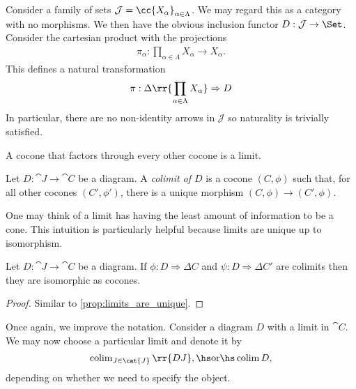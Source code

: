 \documentclass{article}
\begin{document}
\begin{example}
  Consider a family of sets $\mathcal J=\cc{X_\alpha}_{\alpha\in\Lambda}$. We may
  regard this as a category with no morphisms. We then have
  the obvious inclusion functor $D:\mathcal J\to\Set$. Consider the cartesian
  product with the projections
  \begin{align*}
    \pi_\alpha : \prod_{\alpha\in\Lambda} X_\alpha \to X_\alpha.
  \end{align*}
  This defines a natural transformation
  \begin{align*}
    \pi : \Delta\rr{\prod_{\alpha\in\Lambda} X_\alpha}\Rightarrow D
  \end{align*}
  In particular, there are no non-identity arrows in $\mathcal J$ so
  naturality is trivially satisfied.
\end{example}

A cocone that factors through every other cocone is a limit.

\begin{definition}
  Let $D:\cat{J}\to\cat{C}$ be a diagram. A \emph{colimit of $D$} is a cocone
  $(C,\phi)$ such that, for all other cocones $(C',\phi')$, there is a unique morphism
  $(C,\phi)\to(C',\phi)$.
\end{definition}

One may think of a limit has having the least amount of information to be a cone.
This intuition is particularly helpful because limits are unique up to isomorphism.

\begin{proposition}
  Let $D:\cat{J}\to\cat{C}$ be a diagram. If $\phi:D\Rightarrow\Delta C$
  and $\psi:D\Rightarrow\Delta C'$ are colimits then they are isomorphic as cocones.
  \begin{proof}
    Similar to \ref{prop:limits_are_unique}.
  \end{proof}
\end{proposition}

\begin{notation}
  Once again, we improve the notation. Consider a diagram
  $D$ with a limit in $\cat{C}$. We may now choose a particular limit and denote
  it by
  \begin{align*}
    \colim_{J\in\cat{J}}\rr{DJ},\hs\text{or}\hs\colim D,
  \end{align*}
  depending on whether we need to specify the object.
\end{notation}
\end{document}
